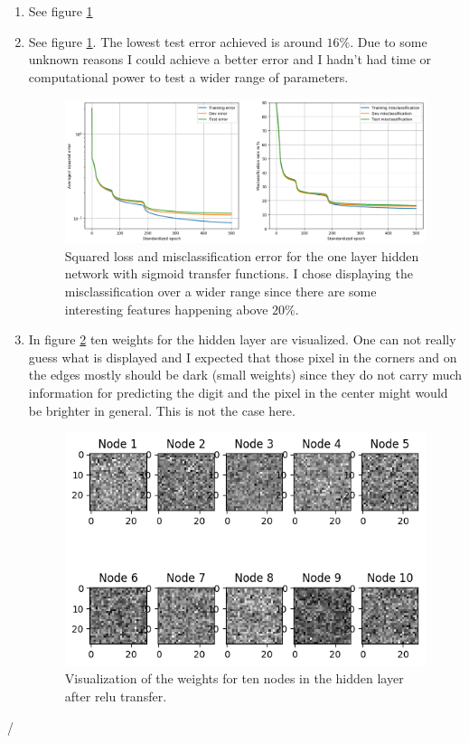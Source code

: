 \documentclass[12pt]{article}
\begin{document}
\begin{enumerate}
\begin{enumerate}[label=(\alph*)]
		\item See figure \ref{fig:relu}
		\item See figure \ref{fig:relu}. The lowest test error achieved is around $16\%$. Due to some unknown reasons I could achieve a better error and I hadn't had time or computational power to test a wider range of parameters.
		\begin{figure}[h]
			\centering
			\includegraphics[width=\linewidth]{./Problem_3/Problem_3.1_0.1_500_relu.png}
			\caption{Squared loss and misclassification error for the one layer hidden network with sigmoid transfer functions. I chose displaying the misclassification over a wider range since there are some interesting features happening above $20\%$.}
			\label{fig:relu}
		\end{figure}
		\item In figure \ref{fig:relu_weights} ten weights for the hidden layer are visualized. One can not really guess what is displayed and I expected that those pixel in the corners and on the edges mostly should be dark (small weights) since they do not carry much information for predicting the digit and the pixel in the center might would be brighter in general. This is not the case here. 
		\begin{figure}[h]
			\centering
			\includegraphics[width=\linewidth]{./Problem_3/Problem_3.1_0.1_500_weights_relu.png}
			\caption{Visualization of the weights for ten nodes in the hidden layer after relu transfer.}
			\label{fig:relu_weights}
		\end{figure}
	\end{enumerate}
	
\end{enumerate}

%	




/
\end{document}
